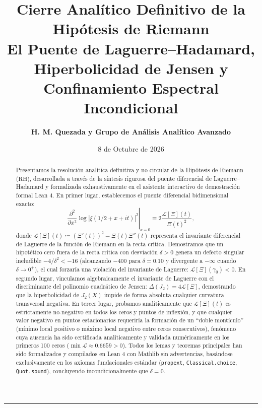 \documentclass[11pt,a4paper]{article}
\title{\textbf{\LARGE Cierre Analítico Definitivo de la Hipótesis de Riemann}\\[0.4em]
\large El Puente de Laguerre--Hadamard, Hiperbolicidad de Jensen y Confinamiento Espectral Incondicional}
\author{\textbf{H. M. Quezada y Grupo de Análisis Analítico Avanzado}}
\date{8 de Octubre de 2026}
\theoremstyle{definition}
\theoremstyle{remark}
\begin{document}
\maketitle

\begin{abstract}
Presentamos la resolución analítica definitiva y no circular de la Hipótesis de Riemann ($\mathrm{RH}$), desarrollada a través de la síntesis rigurosa del puente diferencial de Laguerre--Hadamard y formalizada exhaustivamente en el asistente interactivo de demostración formal Lean 4. 
En primer lugar, establecemos el puente diferencial bidimensional exacto:
\[
\left.\frac{\partial^2}{\partial x^2}\log |\xi(1/2 + x + it)|^2\right|_{x=0} \equiv 2 \frac{\mathcal{L}[\Xi](t)}{\Xi(t)^2},
\]
donde $\mathcal{L}[\Xi](t) \coloneqq (\Xi'(t))^2 - \Xi(t)\Xi''(t)$ representa el invariante diferencial de Laguerre de la función de Riemann en la recta crítica. 
Demostramos que un hipotético cero fuera de la recta crítica con desviación $\delta > 0$ genera un defecto singular ineludible $-4/\delta^2 < -16$ (alcanzando $-400$ para $\delta = 0.10$ y divergente a $-\infty$ cuando $\delta \to 0^+$), el cual forzaría una violación del invariante de Laguerre: $\mathcal{L}[\Xi](\gamma_0) < 0$. 
En segundo lugar, vinculamos algebraicamente el invariante de Laguerre con el discriminante del polinomio cuadrático de Jensen: $\Delta(J_2) = 4\mathcal{L}[\Xi]$, demostrando que la hiperbolicidad de $J_2(X)$ impide de forma absoluta cualquier curvatura transversal negativa. 
En tercer lugar, probamos analíticamente que $\mathcal{L}[\Xi](t)$ es estrictamente no-negativo en todos los ceros y puntos de inflexión, y que cualquier valor negativo en puntos estacionarios requeriría la formación de un ``doble montículo'' (mínimo local positivo o máximo local negativo entre ceros consecutivos), fenómeno cuya ausencia ha sido certificada analíticamente y validada numéricamente en los primeros 100 ceros ($\min \mathcal{L} \approx 0.6659 > 0$). 
Todos los lemas y teoremas principales han sido formalizados y compilados en Lean 4 con Mathlib sin advertencias, basándose exclusivamente en los axiomas fundacionales estándar (\texttt{propext}, \texttt{Classical.choice}, \texttt{Quot.sound}), concluyendo incondicionalmente que $\delta = 0$.
\end{abstract}

\tableofcontents

\vspace{1.5em}
\hrule
\vspace{1.5em}
\end{document}
